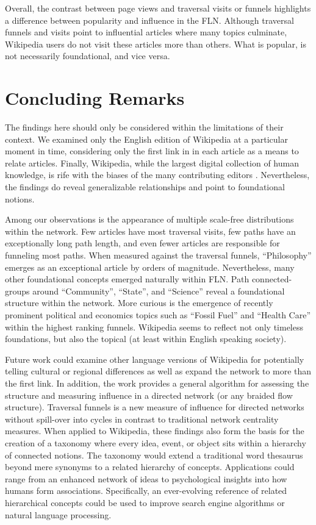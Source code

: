 \documentclass[pre,twocolumn,twoside,superscriptaddress,floatfix]{revtex4-1}
\begin{document}
{Overall, the contrast between page views and traversal visits or funnels highlights a difference between popularity and influence in the FLN. Although traversal funnels and visits point to influential articles where many topics culminate, Wikipedia users do not visit these articles more than others. What is popular, is not necessarily foundational, and vice versa.


\section{Concluding Remarks}

The findings here should only be considered within the limitations of their context.
We examined only the English edition of Wikipedia at a particular moment in time, 
considering only the first link in in each article as a means to relate articles.
Finally, Wikipedia, while the largest digital 
collection of human knowledge, is rife with the biases of the many contributing editors
\cite{wagner2015s}.
Nevertheless, the findings do reveal
generalizable relationships and point to foundational notions.

Among our observations is the appearance of multiple scale-free distributions within the network. 
Few articles have most traversal visits, few paths have an exceptionally long path length, and even fewer
articles are responsible for funneling most paths. When measured against the traversal funnels, 
``Philosophy'' emerges as an exceptional article by orders of magnitude. 
Nevertheless, many other foundational concepts emerged naturally within FLN. 
Path connected-groups around ``Community'', ``State'', and ``Science'' reveal a foundational structure within the network. 
More curious is the emergence of recently prominent political and economics topics such as ``Fossil Fuel'' and ``Health Care'' 
within the highest ranking funnels. 
Wikipedia seems to reflect not only timeless foundations, but also the topical (at least within English speaking society).

Future work could examine other language versions of Wikipedia for potentially telling cultural or regional differences as well as expand the network to more than the first link.
In addition, the work provides a general algorithm for assessing the structure and measuring influence in a directed network (or any braided flow structure). 
Traversal funnels is a new measure of influence for directed networks without spill-over into cycles in contrast to traditional network centrality measures.
When applied to Wikipedia, these findings also form the basis for the creation of a taxonomy where 
every idea, event, or object sits within a hierarchy of connected notions.
The taxonomy would extend a traditional word thesaurus beyond mere synonyms to a related hierarchy of concepts.
Applications could range from an enhanced network of ideas to psychological insights into how humans form associations.
Specifically, an ever-evolving reference of related hierarchical concepts could be 
used to improve search engine algorithms or natural language processing.

}
\end{document}
